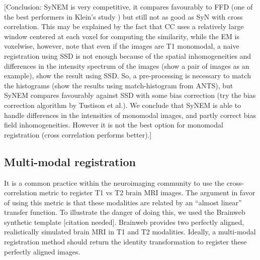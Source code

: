 [Conclusion: SyNEM is very competitive, it compares favourably to FFD (one of the best performers in Klein's study \cite{Klein2009}) but still not as good as SyN with cross
correlation. This may be explained by the fact that CC uses a relatively large window centered at each voxel for computing the similarity, while the EM is voxelwise, however, note that even if the images are T1 monomodal, a naive registration using SSD is not enough because of the spatial inhomogeneities and differences in the intensity spectrum of the images (show a pair of images as an example), show the result using SSD. So, a pre-processing is necessary to match the histograms (show the results using match-histogram from ANTS), but SyNEM compares favourably against SSD with some bias correction (try the bias correction algorithm by Tustison et al.). We conclude that SyNEM is able to handle differences in the intensities of monomodal images, and partly correct bias field inhomogeneities. However it is not the best option for monomodal registration (cross correlation performs better).]

\subsection{Multi-modal registration}
It is a common practice within the neuroimaging community to use the cross-correlation metric to register T1 vs T2 brain MRI images. The argument in favor of using
this metric is that these modalities are related by an ``almost linear'' transfer function. To illustrate the danger of doing this, we used the Brainweb synthetic
template [citation needed]. Brainweb provides two perfectly aligned, realistically simulated brain MRI in T1 and T2 modalities. Ideally, a multi-modal registration method
should return the identity transformation to register these perfectly aligned images.

